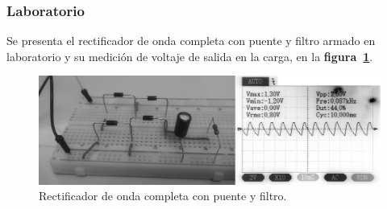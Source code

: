 \subsubsection{Laboratorio}
Se presenta el rectificador de onda completa con puente y filtro armado en
laboratorio y su medición de voltaje de salida en la carga, en la
\textbf{figura~\ref{laboratorio09}}.

\begin{figure}[!h]
\centering
\includegraphics[scale=0.34]{fotos/07.onda_completa2.eps}
\caption{Rectificador de onda completa con puente y filtro.}
\label{laboratorio09}
\end{figure}

